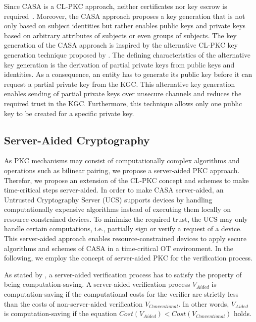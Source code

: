 Since CASA is a CL-PKC approach, neither certificates nor key escrow is required~\cite{AlRiyami2003}.
Moreover, the CASA approach proposes a key generation that is not only based on subject identities but rather enables public keys and private keys based on arbitrary attributes of subjects or even groups of subjects.
The key generation of the CASA approach is inspired by the alternative CL-PKC key generation technique proposed by \citeauthor{AlRiyami2003} \cite{AlRiyami2003}.
The defining characteristics of the alternative key generation is the derivation of partial private keys from public keys and identities.
As a consequence, an entity has to generate its public key before it can request a partial private key from the KGC.
This alternative key generation enables sending of partial private keys over unsecure channels and reduces the required trust in the KGC.
Furthermore, this technique allows only one public key to be created for a specific private key.

\subsection{Server-Aided Cryptography}
As PKC mechanisms may consist of computationally complex algorithms and operations such as bilinear pairing, we propose a server-aided PKC approach.
Therefor, we propose an extension of the CL-PKC concept and schemes to make time-critical steps server-aided.
In order to make CASA server-aided, an Untrusted Cryptography Server (UCS) supports devices by handling computationally expensive algorithms instead of executing them locally on resource-constrained devices.
To minimize the required trust, the UCS may only handle certain computations, i.e., partially sign or verify a request of a device.
This server-aided approach enables resource-constrained devices to apply secure algorithms and schemes of CASA in a time-critical OT environment.
In the following, we employ the concept of server-aided PKC for the verification process.

As stated by \citeauthor{Wu2008} \cite{Wu2008}, a server-aided verification process has to satisfy the property of being computation-saving.
A server-aided verification process $V_{Aided}$ is computation-saving if the computational costs for the verifier are strictly less than the costs of non-server-aided verification $V_{Conventional}$.
In other words, $V_{Aided}$ is computation-saving if the equation $Cost(V_{Aided}) < Cost(V_{Conventional})$ holds.

